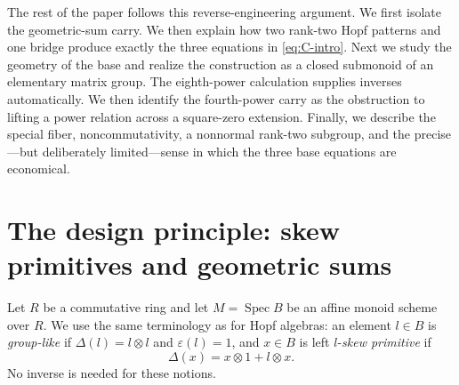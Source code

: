 \documentclass[11pt]{amsart}
\theoremstyle{definition}
\theoremstyle{remark}
\newcommand{\Spec}{\operatorname{Spec}}
\newcommand{\eps}{\varepsilon}
\newcommand{\ot}{\otimes}
\begin{document}
The rest of the paper follows this reverse-engineering argument.  We first
isolate the geometric-sum carry.  We then explain how two rank-two Hopf
patterns and one bridge produce exactly the three equations in
\eqref{eq:C-intro}.  Next we study the geometry of the base and realize the
construction as a closed submonoid of an elementary matrix group.  The
eighth-power calculation supplies inverses automatically.  We then
identify the fourth-power carry as the obstruction to lifting a power
relation across a square-zero extension.  Finally, we describe the special
fiber, noncommutativity, a nonnormal rank-two subgroup, and the
precise---but deliberately limited---sense in which the three base
equations are economical.

\section{The design principle: skew primitives and geometric sums}

Let \(R\) be a commutative ring and let \(M=\Spec B\) be an affine monoid
scheme over \(R\).  We use the same terminology as for Hopf algebras: an
element \(l\in B\) is \emph{group-like} if
\(\Delta(l)=l\ot l\) and \(\eps(l)=1\), and \(x\in B\) is left
\(l\)-\emph{skew primitive} if
\[
 \Delta(x)=x\ot1+l\ot x.
\]
No inverse is needed for these notions.
\end{document}
